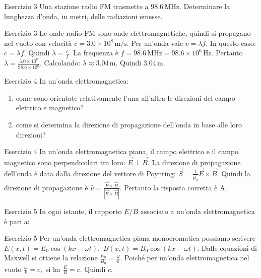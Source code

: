 \documentclass[a4paper]{article}
\begin{document}
\begin{snippetexercise}{Esercizio 3}
    Una stazione radio FM trasmette a \(98.6\,\mathrm{MHz}\). Determinare la
    lunghezza d'onda, in metri, delle radiazioni emesse.

\end{snippetexercise}
\begin{snippetsolution}{Esercizio 3}
    Le onde radio FM sono onde elettromagnetiche, quindi si propagano nel vuoto
    con velocità
    \(c = 3.0 \times 10^8\,\mathrm{m/s}.\)
    Per un'onda vale
    \(v = \lambda f.\)
    In questo caso:
    \(c = \lambda f.\)
    Quindi
    \(\lambda = \frac{c}{f}.\)
    La frequenza è
    \(f = 98.6\,\mathrm{MHz} = 98.6 \times 10^6\,\mathrm{Hz}.\)
    Pertanto
    \(\lambda = \frac{3.0 \times 10^8} {98.6 \times 10^6}.\)
    Calcolando:
    \(\lambda \approx 3.04\,\mathrm{m}.\)
    Quindi
    \(\boxed{3.04\,\mathrm{m}}.\)
\end{snippetsolution}
\begin{snippetexercise}{Esercizio 4}
    In un'onda elettromagnetica:
    \begin{enumerate}[nosep]
        \item come sono orientate relativamente l'una all'altra le direzioni del
        campo elettrico e magnetico?
        \item come si determina la direzione di propagazione dell'onda in base
        alle loro direzioni?
    \end{enumerate}

\end{snippetexercise}
\begin{snippetsolution}{Esercizio 4}
    In un'onda elettromagnetica piana, il campo elettrico e il campo magnetico
    sono perpendicolari tra loro:
    \(\vec{E}\perp\vec{B}.\)
    La direzione di propagazione dell'onda è data dalla direzione del vettore
    di Poynting:
    \(\vec{S} = \frac{1}{\mu_0}\vec{E}\times\vec{B}.\)
    Quindi la direzione di propagazione è
    \(\hat{v} = \frac{\vec{E}\times\vec{B}} {|\vec{E}\times\vec{B}|}.\)
    Pertanto la risposta corretta è
    \(\boxed{\text{A}}.\)
\end{snippetsolution}
\begin{snippetexercise}{Esercizio 5}
    In ogni istante, il rapporto \(E/B\) associato a un'onda elettromagnetica è
    pari a:

\end{snippetexercise}
\begin{snippetsolution}{Esercizio 5}
    Per un'onda elettromagnetica piana monocromatica possiamo scrivere
    \(E(x,t) = E_0\cos(kx-\omega t),\)
    \(B(x,t) = B_0\cos(kx-\omega t).\)
    Dalle equazioni di Maxwell si ottiene la relazione
    \(\frac{E_0}{B_0} = \frac{\omega}{k}.\)
    Poiché per un'onda elettromagnetica nel vuoto
    \(\frac{\omega}{k} = c,\)
    si ha
    \(\frac{E}{B} = c.\)
    Quindi
    \(\boxed{c}.\)
\end{snippetsolution}
\end{document}
